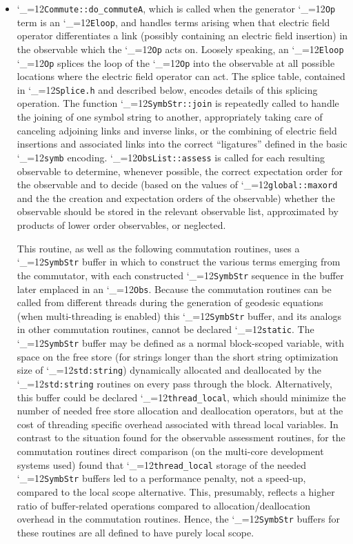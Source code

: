 \documentclass [12pt]{article}
\makeatletter
\renewcommand{\tt}{\begingroup\catcode`_=12\def\_{\string_}\tt@}
\newcommand{\tt@}[1]{\texttt{#1}\endgroup}
\makeatother
\begin{document}
\begin{itemize}
\item
    \tt{Commute::do_commuteA}, which is called when the
    generator \tt{Op} term is an \tt{Eloop}, and
    handles terms arising when that electric field operator
    differentiates a link (possibly containing an electric
    field insertion) in the
    observable which the \tt{Op} acts on.
    Loosely speaking, an \tt{Eloop} \tt{Op} splices
    the loop of the \tt{Op} into the observable at all
    possible locations where the electric field operator
    can act.
    The splice table, contained in \tt{Splice.h} and
    described below, encodes details of this splicing operation.
    The function \tt{SymbStr::join} is repeatedly called to
    handle the joining of one symbol string to another,
    appropriately taking care of canceling adjoining links
    and inverse links, or the combining of electric
    field insertions and associated links into the
    correct ``ligatures'' defined in the basic \tt{symb} encoding.
    \tt{ObsList::assess} is called for each resulting observable
    to determine, whenever possible, the correct expectation order
    for the observable and to decide (based on the
    values of \tt{global::maxord} and the the creation and expectation
    orders of the observable) whether the observable should be stored
    in the relevant observable list, approximated by products
    of lower order observables, or neglected.

    This routine, as well as the following commutation routines,
    uses a \tt{SymbStr} buffer in which to construct the various terms
    emerging from the commutator, with each constructed \tt{SymbStr}
    sequence in the buffer later emplaced in an \tt{Obs}.
    Because the commutation routines can be called from different
    threads during the generation of geodesic equations
    (when multi-threading is enabled) this \tt{SymbStr} buffer,
    and its analogs in other commutation routines,
    cannot be declared \tt{static}.
    The \tt{SymbStr} buffer may be defined as a normal
    block-scoped variable, with space on the free store
    (for strings longer than the short string optimization
    size of \tt{std:string})
    dynamically allocated and deallocated by the
    \tt{std:string} routines on every pass through the block.
    Alternatively,
    this buffer could be declared \tt{thread_local}, which should
    minimize the number of needed free store allocation
    and deallocation operators, but at the cost of threading
    specific overhead associated with thread local variables.
    In contrast to the situation found for the observable assessment
    routines, for the commutation routines
    direct comparison (on the multi-core development systems used)
    found that \tt{thread_local} storage of the needed \tt{SymbStr} buffers
    led to a performance penalty, not a speed-up,
    compared to the local scope alternative.
    This, presumably, reflects a
    higher ratio of buffer-related operations compared
    to allocation/deallocation overhead in the commutation routines.
    Hence, the \tt{SymbStr} buffers for these routines
    are all defined to have purely local scope.


\end{itemize}
\end{document}

